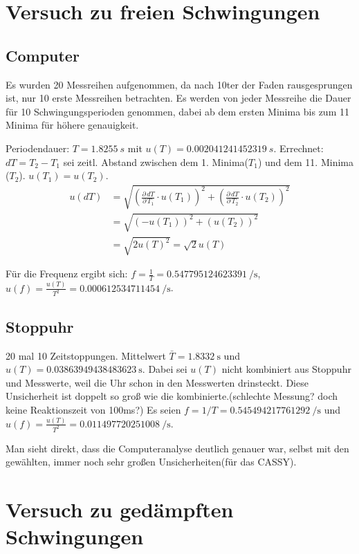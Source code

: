 \documentclass[11pt,a4paper,titlepage, ngerman]{article}
\begin{document}
	\section{Versuch zu freien Schwingungen}
		
		\subsection*{Computer}
		Es wurden 20 Messreihen aufgenommen, da nach 10ter der Faden rausgesprungen ist, nur 10 erste Messreihen betrachten.
		Es werden von jeder Messreihe die Dauer für 10 Schwingungsperioden genommen, dabei ab dem ersten Minima bis zum 11 Minima für höhere genauigkeit.
		
		Periodendauer: $T=\SI{1,8255}{s}$ mit $u(T) = \SI{0,002041241452319}{s}$.
		Errechnet: $dT = T_2 - T_1$ sei zeitl. Abstand zwischen dem 1. Minima($T_1$) und dem 11. Minima ($T_2$).
		$u(T_1) = u(T_2)$.
		\begin{align}
			u(dT) &= \sqrt{\left( \frac{\partial\,dT}{\partial\,T_1} \cdot u(T_1)\right)^2 +\left( \frac{\partial\,dT}{\partial\,T_2} \cdot u(T_2)\right)^2}\\
			&= \sqrt{(-u(T_1))^2 + (u(T_2))^2}\\
			&= \sqrt{2 u(T)^2} = \sqrt{2} u(T)
		\end{align}
		
		Für die Frequenz ergibt sich: $f=\frac{1}{T} = \SI{0,547795124623391}{\per\second}$, 
		$u(f) = \frac{u(T)}{T^2} =\SI{ 0,000612534711454}{\per\second}$.
		
		\subsection*{Stoppuhr}
		20  mal 10 Zeitstoppungen.
		Mittelwert $\bar{T} = \SI{1,8332}{\second}$ und $u(T) = \SI{0,03863949438483623}{\second}$.
		Dabei sei $u(T)$ nicht kombiniert aus Stoppuhr und Messwerte, weil die Uhr schon in den Messwerten drinsteckt.
		Diese Unsicherheit ist doppelt so groß wie die kombinierte.(schlechte Messung? doch keine Reaktionszeit von 100ms?)
		Es seien $f=1/T = \SI{0,545494217761292}{\per\second}$ und $u(f) = \frac{u(T)}{T^2}= \SI{0,011497720251008}{\per\second}$.
		
		Man sieht direkt, dass die Computeranalyse deutlich genauer war, selbst mit den gewählten, immer noch sehr großen Unsicherheiten(für das CASSY).
		
	\section{Versuch zu gedämpften Schwingungen}
	
\end{document}
